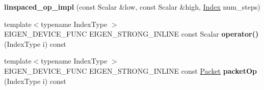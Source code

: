 \begin{DoxyCompactItemize}
\item 
\mbox{\label{struct_eigen_1_1internal_1_1linspaced__op__impl_3_01_scalar_00_01_packet_00_01false_01_4_a0ef567342fc3d2ffc7667de9fbb147ef}} 
{\bfseries linspaced\+\_\+op\+\_\+impl} (const Scalar \&low, const Scalar \&high, \hyperlink{namespace_eigen_a62e77e0933482dafde8fe197d9a2cfde}{Index} num\+\_\+steps)
\item 
\mbox{\label{struct_eigen_1_1internal_1_1linspaced__op__impl_3_01_scalar_00_01_packet_00_01false_01_4_afea6cee796a7dfb63c34d888457ac12b}} 
{\footnotesize template$<$typename Index\+Type $>$ }\\E\+I\+G\+E\+N\+\_\+\+D\+E\+V\+I\+C\+E\+\_\+\+F\+U\+NC E\+I\+G\+E\+N\+\_\+\+S\+T\+R\+O\+N\+G\+\_\+\+I\+N\+L\+I\+NE const Scalar {\bfseries operator()} (Index\+Type i) const
\item 
\mbox{\label{struct_eigen_1_1internal_1_1linspaced__op__impl_3_01_scalar_00_01_packet_00_01false_01_4_abfaac1602220b86936bf2a11fc7c3767}} 
{\footnotesize template$<$typename Index\+Type $>$ }\\E\+I\+G\+E\+N\+\_\+\+D\+E\+V\+I\+C\+E\+\_\+\+F\+U\+NC E\+I\+G\+E\+N\+\_\+\+S\+T\+R\+O\+N\+G\+\_\+\+I\+N\+L\+I\+NE const \hyperlink{union_eigen_1_1internal_1_1_packet}{Packet} {\bfseries packet\+Op} (Index\+Type i) const
\end{DoxyCompactItemize}
